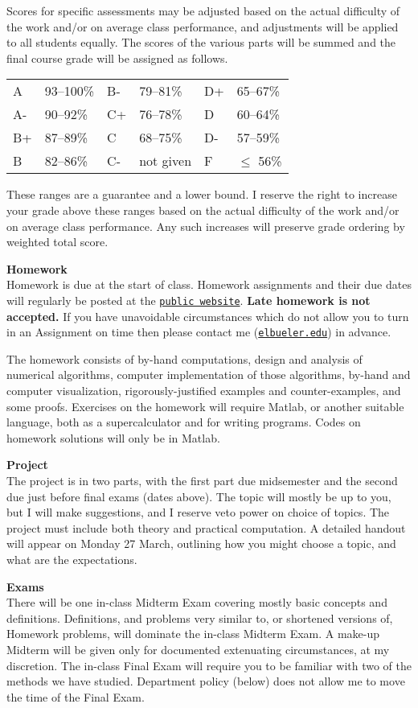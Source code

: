 \documentclass[12pt]{article}
\renewcommand{\emph}[1]{\textsf{\textbf{#1}}}
\newcommand{\localhead}[1]{\par\smallskip\textbf{#1} \smallskip\nobreak\\}%
\def\heading#1{\localhead{\large\emph{#1}}}
\begin{document}
Scores for specific assessments may be adjusted based on the actual difficulty of the work and/or on average class performance, and adjustments will be applied to all students equally.  The scores of the various parts will be summed and the final course grade will be assigned as follows.

\begin{tabular}{llllll}
A  & 93--100\% & B- & 79--81\%  & D+ & 65--67\%  \\
A- & 90--92\%  & C+ & 76--78\%  & D  & 60--64\%  \\
B+ & 87--89\%  & C  & 68--75\%  & D- & 57--59\%  \\
B  & 82--86\%  & C- & not given & F  & $\le$ 56\%
\end{tabular}

These ranges are a guarantee and a lower bound.  I reserve the right to increase your grade above these ranges based on the actual difficulty of the work and/or on average class performance.  Any such increases will preserve grade ordering by weighted total score.


\heading{Homework}
Homework is due at the start of class.  Homework assignments and their due dates will regularly be posted at the \href{https://bueler.github.io/nade/}{\texttt{public website}}.  \emph{Late homework is not accepted.}  If you have unavoidable circumstances which do not allow you to turn in an Assignment on time then please contact me (\href{mailto:elbueler@alaska.edu}{\texttt{elbueler\@@alaska.edu}}) in advance.

The homework consists of by-hand computations, design and analysis of numerical algorithms, computer implementation of those algorithms, by-hand and computer visualization, rigorously-justified examples and counter-examples, and some proofs.  Exercises on the homework will require Matlab, or another suitable language, both as a supercalculator and for writing programs.  Codes on homework solutions will only be in Matlab.


\heading{Project}
The project is in two parts, with the first part due midsemester and the second due just before final exams (dates above).  The topic will mostly be up to you, but I will make suggestions, and I reserve veto power on choice of topics.  The project must include both theory and practical computation.  A detailed handout will appear on Monday 27 March, outlining how you might choose a topic, and what are the expectations.


\heading{Exams}
There will be one in-class Midterm Exam covering mostly basic concepts and definitions.  Definitions, and problems very similar to, or shortened versions of, Homework problems, will dominate the in-class Midterm Exam.  A make-up Midterm will be given only for documented extenuating circumstances, at my discretion.  The in-class Final Exam will require you to be familiar with two of the methods we have studied.  Department policy (below) does not allow me to move the time of the Final Exam.
\end{document}
